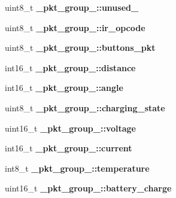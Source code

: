 \begin{DoxyCompactItemize}
\item 
\hypertarget{group__roomba-lib_ga7601c93edd806422c44f23acb1f04e25}{}uint8\+\_\+t {\bfseries \+\_\+pkt\+\_\+group\+\_\+::unused\+\_}\label{group__roomba-lib_ga7601c93edd806422c44f23acb1f04e25}

\item 
\hypertarget{group__roomba-lib_ga9f77bcc036318f7d862c433bcf7efd65}{}uint8\+\_\+t {\bfseries \+\_\+pkt\+\_\+group\+\_\+::ir\+\_\+opcode}\label{group__roomba-lib_ga9f77bcc036318f7d862c433bcf7efd65}

\item 
\hypertarget{group__roomba-lib_ga401f999368acbd379c7711170b72de89}{}uint8\+\_\+t {\bfseries \+\_\+pkt\+\_\+group\+\_\+::buttons\+\_\+pkt}\label{group__roomba-lib_ga401f999368acbd379c7711170b72de89}

\item 
\hypertarget{group__roomba-lib_ga1fcbb890062dd586ff86a086a602893d}{}int16\+\_\+t {\bfseries \+\_\+pkt\+\_\+group\+\_\+::distance}\label{group__roomba-lib_ga1fcbb890062dd586ff86a086a602893d}

\item 
\hypertarget{group__roomba-lib_ga48231f4871a323c2b0a0f3d9597d5043}{}int16\+\_\+t {\bfseries \+\_\+pkt\+\_\+group\+\_\+::angle}\label{group__roomba-lib_ga48231f4871a323c2b0a0f3d9597d5043}

\item 
\hypertarget{group__roomba-lib_ga2adb514c4766dd622c86e6d2bbc7485f}{}uint8\+\_\+t {\bfseries \+\_\+pkt\+\_\+group\+\_\+::charging\+\_\+state}\label{group__roomba-lib_ga2adb514c4766dd622c86e6d2bbc7485f}

\item 
\hypertarget{group__roomba-lib_ga7ef5d3c12b11f7d3d09b827c0c3c54d3}{}uint16\+\_\+t {\bfseries \+\_\+pkt\+\_\+group\+\_\+::voltage}\label{group__roomba-lib_ga7ef5d3c12b11f7d3d09b827c0c3c54d3}

\item 
\hypertarget{group__roomba-lib_ga61306111eac0f15e4e4d2d939a02bdd0}{}int16\+\_\+t {\bfseries \+\_\+pkt\+\_\+group\+\_\+::current}\label{group__roomba-lib_ga61306111eac0f15e4e4d2d939a02bdd0}

\item 
\hypertarget{group__roomba-lib_gacc424a4672fd8b32df7f5268a79c8d7c}{}int8\+\_\+t {\bfseries \+\_\+pkt\+\_\+group\+\_\+::temperature}\label{group__roomba-lib_gacc424a4672fd8b32df7f5268a79c8d7c}

\item 
\hypertarget{group__roomba-lib_gae544ca13929fe4c706f593cc2139ea3e}{}uint16\+\_\+t {\bfseries \+\_\+pkt\+\_\+group\+\_\+::battery\+\_\+charge}\label{group__roomba-lib_gae544ca13929fe4c706f593cc2139ea3e}


\end{DoxyCompactItemize}
